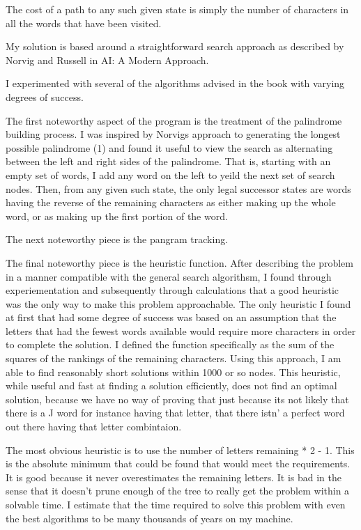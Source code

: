 The cost of a path to any such given state is simply the number of
characters in all the words that have been visited.

My solution is based around a straightforward search approach as
described by Norvig and Russell in AI: A Modern Approach.

I experimented with several of the algorithms advised in the book with
varying degrees of success.

The first noteworthy aspect of the program is the treatment of the
palindrome building process. I was inspired by Norvigs approach to
generating the longest possible palindrome (1) and found it useful to
view the search as alternating between the left and right sides of the
palindrome. That is, starting with an empty set of words, I add any
word on the left to yeild the next set of search nodes. Then, from any
given such state, the only legal successor states are words having the
reverse of the remaining characters as either making up the whole
word, or as making up the first portion of the word.

The next noteworthy piece is the pangram tracking.

The final noteworthy piece is the heuristic function. After describing
the problem in a manner compatible with the general search algorithsm,
I found through experiementation and subsequently through calculations
that a good heuristic was the only way to make this problem
approachable. The only heuristic I found at first that had some degree
of success was based on an assumption that the letters that had the
fewest words available would require more characters in order to
complete the solution. I defined the function specifically as the sum
of the squares of the rankings of the remaining characters. Using this
approach, I am able to find reasonably short solutions within 1000 or
so nodes. This heuristic, while useful and fast at finding a solution
efficiently, does not find an optimal solution, because we have no way
of proving that just because its not likely that there is a J word for
instance having that letter, that there istn' a perfect word out there
having that letter combintaion.

The most obvious heuristic is to use the number of letters remaining *
2 - 1. This is the absolute minimum that could be found that would
meet the requirements. It is good because it never overestimates the
remaining letters. It is bad in the sense that it doesn't prune enough
of the tree to really get the problem within a solvable time. I
estimate that the time required to solve this problem with even the
best algorithms to be many thousands of years on my machine.


